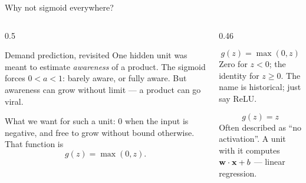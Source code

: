 \documentclass[aspectratio=169,10pt]{beamer}
\begin{document}
\begin{frame}{Why not sigmoid everywhere?}
  \begin{columns}[T,onlytextwidth]
    \begin{column}{0.5\textwidth}
      \begin{block}{Demand prediction, revisited}
        \footnotesize
        One hidden unit was meant to estimate \emph{awareness} of a product. The sigmoid
        forces $0<a<1$: barely aware, or fully aware. But awareness can grow without limit
        --- a product can go viral.
      \end{block}
      \footnotesize
      What we want for such a unit: $0$ when the input is negative, and free to grow
      without bound otherwise. That function is
      \[ g(z)=\max(0,z). \]
    \end{column}
    \begin{column}{0.46\textwidth}
      \begin{defnbox}
        \small
        \[ g(z)=\max(0,z) \]
        Zero for $z<0$; the identity for $z\ge0$. The name is historical; just say ReLU.
      \end{defnbox}
      \begin{defnbox}
        \small
        \[ g(z)=z \]
        Often described as ``no activation''. A unit with it computes $\mathbf{w}\cdot\mathbf{x}+b$ ---
        linear regression.
      \end{defnbox}
    \end{column}
  \end{columns}
\end{frame}
\end{document}
